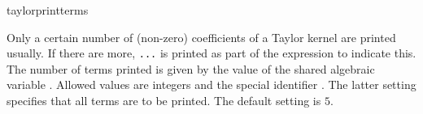 \begin{Variable}{taylorprintterms}
 
    Only a certain number of (non-zero) coefficients of a Taylor
    kernel are printed usually. If there are more, \verb|...| is
    printed as part of the expression to indicate this. The number of
    terms printed is given by the value of the shared algebraic
    variable .  Allowed values are integers
    and the special identifier . The latter setting
    specifies that all terms are to be printed. The default setting is
    $5$.
 
\end{Variable}

